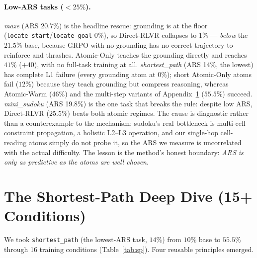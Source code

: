 \documentclass{article}
\begin{document}
\paragraph{Low-ARS tasks ($<25\%$).}
\emph{maze} (ARS 20.7\%) is the headline rescue: grounding is at the floor
(\texttt{locate\_start}/\texttt{locate\_goal} 0\%), so Direct-RLVR collapses to $1\%$ ---
\emph{below} the $21.5\%$ base, because GRPO with no grounding has no correct trajectory to
reinforce and thrashes. Atomic-Only teaches the grounding directly and reaches $41\%$ ($+40$),
with no full-task training at all. \emph{shortest\_path} (ARS 14\%, the lowest) has complete L1
failure (every grounding atom at 0\%); short Atomic-Only atoms fail ($12\%$) because they teach
grounding but compress reasoning, whereas Atomic-Warm ($46\%$) and the multi-step variants of
Appendix~\ref{app:sp} ($55.5\%$) succeed. \emph{mini\_sudoku} (ARS 19.8\%) is the one task that
breaks the rule: despite low ARS, Direct-RLVR ($25.5\%$) beats both atomic regimes. The cause is
diagnostic rather than a counterexample to the mechanism: sudoku's real bottleneck is multi-cell
constraint propagation, a holistic L2--L3 operation, and our single-hop cell-reading atoms simply
do not probe it, so the ARS we measure is uncorrelated with the actual difficulty. The lesson is
the method's honest boundary: \emph{ARS is only as predictive as the atoms are well chosen}.

\clearpage

\section{The Shortest-Path Deep Dive (15+ Conditions)}
\label{app:sp}
We took \texttt{shortest\_path} (the lowest-ARS task, $14\%$) from $10\%$ base to $55.5\%$ through
16 training conditions (Table~\ref{tab:sp}). Four reusable principles emerged.
\end{document}
